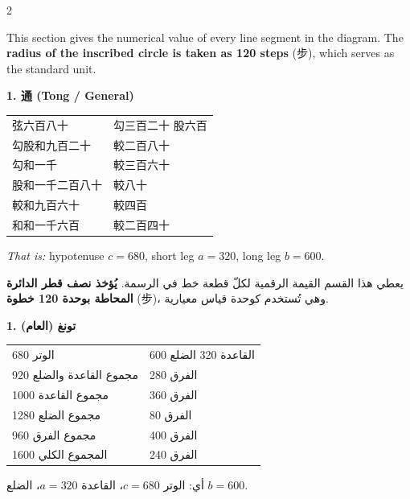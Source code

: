 \documentclass[11pt,a4paper]{article}
\newcommand{\ar}[1]{\arabicfont\beginR #1\endR}
\begin{document}
\begin{paracol}{2}

This section gives the numerical value of every line segment in the diagram. The \textbf{radius of the inscribed circle is taken as 120 steps} (步), which serves as the standard unit.

\vspace{0.3cm}

\textbf{1. 通 (Tong / General)}

\begin{center}
\begin{tabular}{ll}
弦六百八十 & 勾三百二十 \quad 股六百 \\
勾股和九百二十 & 較二百八十 \\
勾和一千 & 較三百六十 \\
股和一千二百八十 & 較八十 \\
較和九百六十 & 較四百 \\
和和一千六百 & 較二百四十 \\
\end{tabular}
\end{center}

\textit{That is:} hypotenuse $c = 680$, short leg $a = 320$, long leg $b = 600$.

\switchcolumn

\ar{يعطي هذا القسم القيمة الرقمية لكلّ قطعة خط في الرسمة. \textbf{يُؤخذ نصف قطر الدائرة المحاطة بوحدة 120 خطوة} (步)، وهي تُستخدم كوحدة قياس معيارية.}

\vspace{0.3cm}

\ar{\textbf{1. تونغ (العام)}}

\begin{center}
\begin{tabular}{ll}
\ar{الوتر 680} & \ar{القاعدة 320 \quad الضلع 600} \\
\ar{مجموع القاعدة والضلع 920} & \ar{الفرق 280} \\
\ar{مجموع القاعدة 1000} & \ar{الفرق 360} \\
\ar{مجموع الضلع 1280} & \ar{الفرق 80} \\
\ar{مجموع الفرق 960} & \ar{الفرق 400} \\
\ar{المجموع الكلي 1600} & \ar{الفرق 240} \\
\end{tabular}
\end{center}

\vspace{0.3cm}

\ar{أي: الوتر $c = 680$، القاعدة $a = 320$، الضلع $b = 600$.}

\end{paracol}
\end{document}
